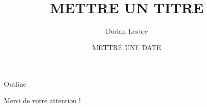 \documentclass[14pt]{beamer}
\title{METTRE UN TITRE}
\author{Dorian Lesbre}
\date{METTRE UNE DATE}
\begin{document}
\begin{frame}
\titlepage
\end{frame}

\begin{frame}{Outline}
\tableofcontents
\end{frame}




\begin{frame}
    \Large
    \begin{center}
        Merci de votre attention !
    \end{center}{}
\end{frame}
\end{document}
